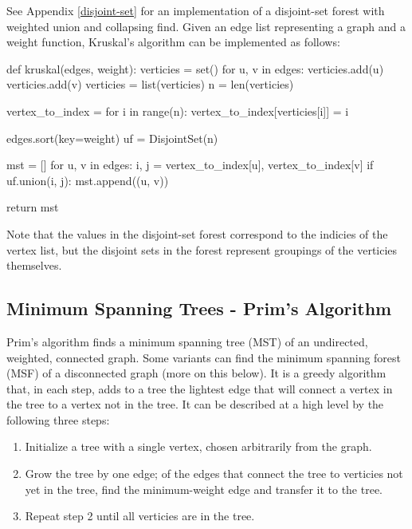 \documentclass[12pt, titlepage]{article}
\begin{document}
See Appendix \ref{disjoint-set} for an implementation of a disjoint-set forest with weighted union and collapsing find. Given an edge list representing a graph and a weight function, Kruskal's algorithm can be implemented as follows: \medskip

\begin{python}
def kruskal(edges, weight):
    verticies = set()
    for u, v in edges:
        verticies.add(u)
        verticies.add(v)
    verticies = list(verticies)
    n = len(verticies)

    vertex_to_index = {}
    for i in range(n):
        vertex_to_index[verticies[i]] = i

    edges.sort(key=weight)
    uf = DisjointSet(n)

    mst = []
    for u, v in edges:
        i, j = vertex_to_index[u], vertex_to_index[v]
        if uf.union(i, j):
            mst.append((u, v))

    return mst
\end{python}

Note that the values in the disjoint-set forest correspond to the indicies of the vertex list, but the disjoint sets in the forest represent groupings of the verticies themselves.

\subsection{Minimum Spanning Trees - Prim's Algorithm} \label{prim}

Prim's algorithm finds a minimum spanning tree (MST) of an undirected, weighted, connected graph. Some variants can find the minimum spanning forest (MSF) of a disconnected graph (more on this below). It is a greedy algorithm that, in each step, adds to a tree the lightest edge that will connect a vertex in the tree to a vertex not in the tree. It can be described at a high level by the following three steps:

\begin{enumerate}
  \item Initialize a tree with a single vertex, chosen arbitrarily from the graph.
  \item Grow the tree by one edge; of the edges that connect the tree to verticies not yet in the tree, find the minimum-weight edge and transfer it to the tree.
  \item Repeat step 2 until all verticies are in the tree.
\end{enumerate}
\end{document}
